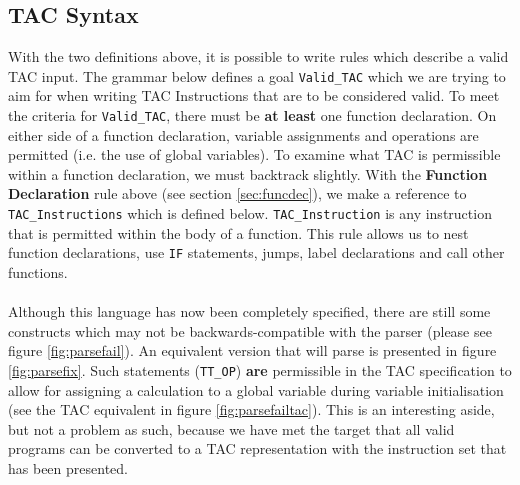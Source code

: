 \subsection{TAC Syntax}
With the two definitions above, it is possible to write rules which describe a valid TAC input. The grammar below defines a goal \verb!Valid_TAC! which we are trying to aim for when writing TAC Instructions that are to be considered valid. To meet the criteria for \verb!Valid_TAC!, there must be \textbf{at least} one function declaration. On either side of a function declaration, variable assignments and operations are permitted (i.e. the use of global variables). To examine what TAC is permissible within a function declaration, we must backtrack slightly. With the \textbf{Function Declaration} rule above (see section \ref{sec:funcdec}), we make a reference to \verb!TAC_Instructions! which is defined below. \verb!TAC_Instruction! is any instruction that is permitted within the body of a function. This rule allows us to nest function declarations, use \verb!IF! statements, jumps, label declarations and call other functions.
\ \\ \ \\
Although this language has now been completely specified, there are still some constructs which may not be backwards-compatible with the \mmc parser (please see figure \ref{fig:parsefail}). An equivalent version that will parse is presented in figure \ref{fig:parsefix}. Such statements (\verb!TT_OP!) \textbf{are} permissible in the TAC specification to allow for assigning a calculation to a global variable during variable initialisation (see the TAC equivalent in figure \ref{fig:parsefailtac}). This is an interesting aside, but not a problem as such, because we have met the target that all valid \mmc programs can be converted to a TAC representation with the instruction set that has been presented.

